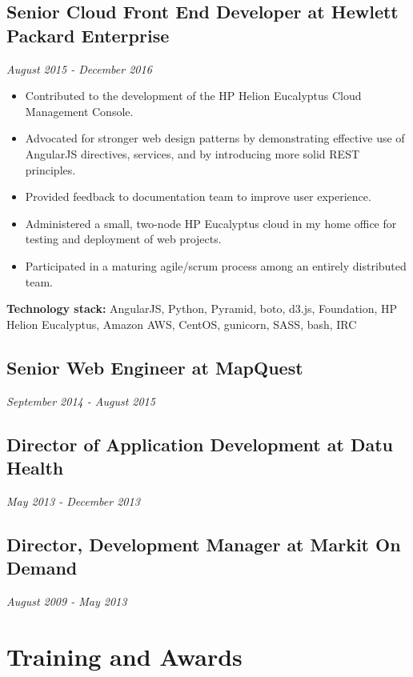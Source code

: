 \documentclass[11pt]{article}
\begin{document}
\subsection*{Senior Cloud Front End Developer at Hewlett Packard Enterprise}
\emph{August 2015 - December 2016}
\begin{itemize}
  \item Contributed to the development of the HP Helion Eucalyptus Cloud Management Console.
  \item Advocated for stronger web design patterns by demonstrating effective use of AngularJS directives, services, and by introducing more solid REST principles.
  \item Provided feedback to documentation team to improve user experience.
  \item Administered a small, two-node HP Eucalyptus cloud in my home office for testing and deployment of web projects.
  \item Participated in a maturing agile/scrum process among an entirely distributed team.
\end{itemize}
\textbf{Technology stack:} AngularJS, Python, Pyramid, boto, d3.js, Foundation, HP Helion Eucalyptus, Amazon AWS, CentOS, gunicorn, SASS, bash, IRC

\subsection*{Senior Web Engineer at MapQuest}
\emph{September 2014 - August 2015}

\subsection*{Director of Application Development at Datu Health}
\emph{May 2013 - December 2013}

\subsection*{Director, Development Manager at Markit On Demand}
\emph{August 2009 - May 2013}

\section*{Training and Awards}
\end{document}
